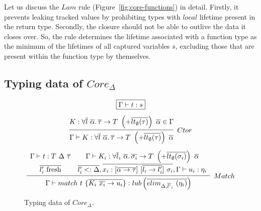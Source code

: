 \documentclass[11pt]{article}
\newcommand{\mathframebox}[1]{\framebox{$\displaystyle #1$}}
\newcommand{\ap}{~}
\begin{document}
    Let us discuss the $Lam$ rule (Figure\ \ref{fig:core-functions}) in detail.
    Firstly, it prevents leaking tracked values by prohibiting types with $local$ lifetime present in the return type.
    Secondly, the closure should not be able to outlive the data it closes over.
    So, the rule determines the lifetime associated with a function type as the minimum of the lifetimes of all captured variables $\overline{s}$, excluding those that are present within the function type by themselves. %

    \subsection{Typing data of $Core_\Delta$} \label{subsec:typing-data}

    \begin{figure}
        \begin{gather*}
            \mathframebox{\Gamma\vdash t : s} \\[0.5em]
            \infer[Ctor]{\Gamma\vdash K : \forall\overline{l}\ \overline{\alpha}\ldotp \overline{\tau}\to T \ap\left(+\overline{lt_\emptyset(\tau)}\right)\ap \overline{\alpha}}{K : \forall\overline{l}\ \overline{\alpha}\ldotp \overline{\tau}\to T \ap\left(+\overline{lt_\emptyset(\tau)}\right)\ap \overline{\alpha} \in \Gamma} \\[0.5em]
            \infer[Match]{
                \Gamma\vdash match ~ t ~\{ \overline{K_i\ap \overline{x_{i}} \to u_i }\}  : lub\left(\overline{elim_{\Delta, \overline{l'}_i}\ap(\eta_i)}\right)
            }{
                \begin{array}{cc}
                    \Gamma\vdash t : T\ap\Delta \ap\overline{\tau}
                    &
                    \Gamma\vdash K_i : \forall \overline{l}_i~\overline{\alpha}\ldotp \overline{\sigma_{i}} \to T\ap\left(+\overline{lt_\emptyset(\sigma_i)}\right)\ap\overline{\alpha}
                    \\[0.4em]
                    \overline{l_i' \text{ fresh}}
                    &
                    \overline{l_i' <: \Delta}, \overline{x_i : [\overline{\alpha\to\tau}]\ap[\overline{l_i\to l_i'}]\ap\sigma_i}, \Gamma \vdash u_i : \eta_i
                \end{array}
            }
        \end{gather*}
        \caption{Typing data of $Core_{\Delta}$.}
        \label{fig:core-data-typing}
    \end{figure}
\end{document}
